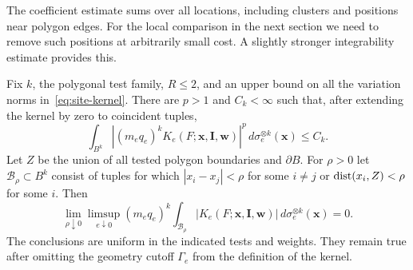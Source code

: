 The coefficient estimate sums over all locations, including clusters
and positions near polygon edges.  For the local comparison in the
next section we need to remove such positions at arbitrarily small
cost.  A slightly stronger integrability estimate provides this.

\begin{lemma}
\label{lem:location-ui}
Fix $k$, the polygonal test family, $R\leq2$, and an upper bound on
all the variation norms in~\eqref{eq:site-kernel}.  There are $p>1$ and
$C_k<\infty$ such that, after extending the kernel by zero to coincident
tuples,
\begin{equation}
 \int_{B^k}
   \left|(m_eq_e)^kK_e(F;\mathbf x,\mathbf I,\mathbf w)\right|^p
                      \,d\sigma_e^{\otimes k}(\mathbf x)
                   \leq C_k.
 \label{eq:kernel-lp}
\end{equation}
Let $Z$ be the union of all tested polygon boundaries and $\partial B$.
For $\rho>0$ let $\mathcal B_\rho\subset B^k$ consist of tuples for
which $|x_i-x_j|<\rho$ for some $i\ne j$ or
$\operatorname{dist}(x_i,Z)<\rho$ for some $i$.  Then
\begin{equation}
 \lim_{\rho\downarrow0}\limsup_{e\downarrow0}
    (m_eq_e)^k\int_{\mathcal B_\rho}
       |K_e(F;\mathbf x,\mathbf I,\mathbf w)|
                       \,d\sigma_e^{\otimes k}(\mathbf x)=0.
 \label{eq:location-cutoff}
\end{equation}
The conclusions are uniform in the indicated tests and weights.
They remain true after omitting the geometry cutoff $\Gamma_e$ from
the definition of the kernel.
\end{lemma}

